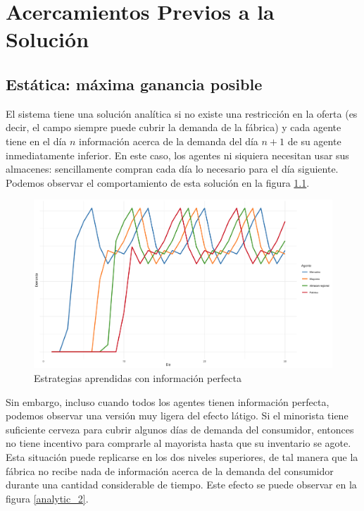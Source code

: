 \chapter{Acercamientos Previos a la Soluci\'on}

\section{Est\'atica: m\'axima ganancia posible}

El sistema tiene una soluci\'on anal\'itica si no existe una restricci\'on en la oferta (es decir, el campo siempre puede cubrir la demanda de la f\'abrica) y cada agente tiene en el d\'ia $n$ informaci\'on acerca de la demanda del d\'ia $n+1$ de su agente inmediatamente inferior. En este caso, los agentes ni siquiera necesitan usar sus almacenes: sencillamente compran cada d\'ia lo necesario para el d\'ia siguiente. Podemos observar el comportamiento de esta soluci\'on en la figura \ref{analytic_1}.

\begin{figure}[ht!]
\caption{Estrategias aprendidas con informaci\'on perfecta}
\label{analytic_1}
\includegraphics[width=12cm]{tesis_tex/figs/analytic_solution_0_all_0_inv.png}
\centering
\end{figure}

Sin embargo, incluso cuando todos los agentes tienen informaci\'on perfecta, podemos observar una versi\'on muy ligera del efecto l\'atigo. Si el minorista tiene suficiente cerveza para cubrir algunos d\'ias de demanda del consumidor, entonces no tiene incentivo para comprarle al mayorista hasta que su inventario se agote. Esta situaci\'on puede replicarse en los dos niveles superiores, de tal manera que la f\'abrica no recibe nada de informaci\'on acerca de la demanda del consumidor durante una cantidad considerable de tiempo. Este efecto se puede observar en la figura \ref{analytic_2}.

